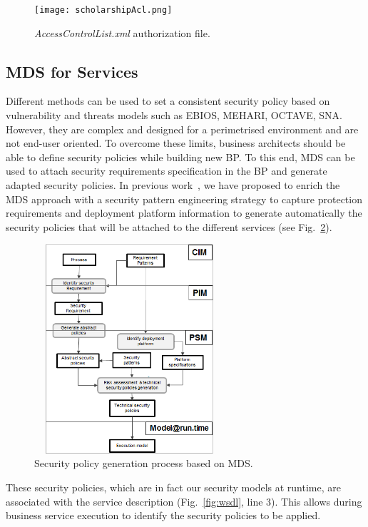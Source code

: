 \documentclass[runningheads,a4paper]{llncs}
\begin{document}
\begin{figure}
\centering
\texttt{[image: scholarshipAcl.png]}
\caption{\textit{AccessControlList.xml} authorization file.}
\label{fig:acl}
\end{figure}

\subsection{MDS for Services}

Different methods can be used to set a consistent security policy based on vulnerability and threats models such as EBIOS, MEHARI, OCTAVE, SNA. However, they are complex and designed for a perimetrised environment and are not end-user oriented. To overcome these limits, business architects should be able to define security policies while building new BP. To this end, MDS can be used to attach security requirements specification in the BP and generate adapted security policies.
In previous work~\cite{OBG12}, we have proposed to enrich the MDS approach with a security pattern engineering strategy to capture protection requirements and deployment platform information to generate automatically the security policies that will be attached to the different services (see Fig.~\ref{fig:mds}).

\begin{figure}[ht!] 
\centering
\includegraphics[height=220pt,width=200pt]{mds.png}
\caption{Security policy generation process based on MDS.}
\label{fig:mds}
\end{figure}

These security policies, which are in fact our security models at runtime, are associated with the service description (Fig.~\ref{fig:wsdl}, line 3). This allows during business service execution to identify the security policies to be applied.
\end{document}
